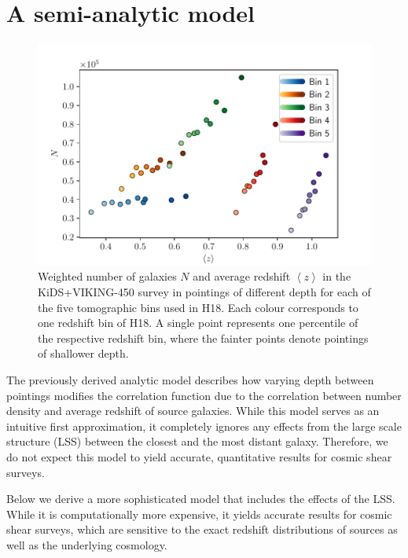 \documentclass{aa}
\def\la{\left<}
\def\ra{\right>}
\begin{document}
\section{A semi-analytic model}
\label{sec:xipm_semianalytic}
\begin{figure}
\centering
\includegraphics[width=\linewidth]{images/cov_nz_meanz.pdf}
\caption{Weighted number of galaxies $N$ and average redshift $\la z\ra$ in the KiDS+VIKING-450 survey \citep[KV450,][]{Wright:2018} in pointings of different depth for each of the five tomographic bins used in H18. Each colour corresponds to one redshift bin of H18. A single point represents one percentile of the respective redshift bin, where the fainter points denote pointings of shallower depth.}
\label{fig:nz_of_meanz}
\end{figure}
The previously derived analytic model describes how varying depth between pointings modifies the correlation function due to the correlation between number density and average redshift of source galaxies. While this model serves as an intuitive first approximation, it completely ignores any effects from the large scale structure (LSS) between the closest and the most distant galaxy. Therefore, we do not expect this model to yield accurate, quantitative results for cosmic shear surveys.

Below we derive a more sophisticated model that includes the effects of the LSS. While it is computationally more expensive, it yields accurate results for cosmic shear surveys, which are sensitive to the exact redshift distributions of sources as well as the underlying cosmology.
\end{document}
